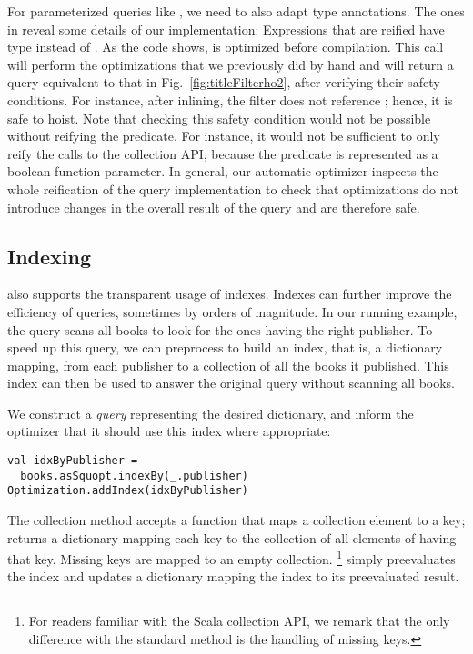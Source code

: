 For parameterized queries like , we need to also adapt type annotations.
The ones in  reveal some details of our implementation:
Expressions that are reified have type  instead of .
As the code shows,  is optimized before compilation. This call will perform the optimizations that we previously did by hand
and will return a query equivalent to that in Fig.~\ref{fig:titleFilterho2}, after verifying their safety conditions. For instance, 
after inlining, the filter  does not reference ; hence, it is safe to hoist. 
Note that checking this safety condition would not be possible without reifying the predicate. For instance, it would
not be sufficient to only reify the calls to the collection API, because the predicate is represented as a boolean function parameter.
In general, our automatic optimizer inspects the whole reification of the query implementation to check that optimizations
do not introduce changes in the overall result of the query and are therefore safe.

\subsection{Indexing}

{\LoS} also supports the transparent usage of indexes. Indexes can further improve the efficiency of queries, sometimes by orders of magnitude. 
In our running example, the query scans all books to look for the ones having the right publisher. To speed up this query, we can preprocess  to build an index, that is, a dictionary mapping, from each publisher to a collection of all the books it published. This index can then be used to answer the original query without scanning all books.

We construct a \emph{query} representing the desired dictionary, and inform the optimizer that it should use this index where appropriate:
\begin{lstlisting}
val idxByPublisher =
  books.asSquopt.indexBy(_.publisher)
Optimization.addIndex(idxByPublisher)
\end{lstlisting}

The  collection method accepts a function that maps a collection element to a key;  returns a dictionary mapping each key to the collection of all elements of  having that key. Missing keys are mapped to an empty collection.%
\footnote{For readers familiar with the Scala collection API, we remark that the only difference with the standard  method is the handling of missing keys.}
 simply preevaluates the index and updates a dictionary mapping the index to its preevaluated result. 

